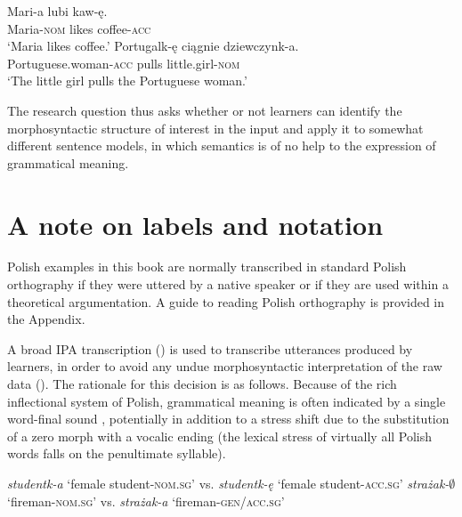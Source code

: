 \ea%
    \label{ex:01:6}
    \ea\label{ex:01:6a}
    \gll    Mari-a lubi kaw-ę.\\
            Maria-\textsc{nom}  likes  coffee-\textsc{acc}\\
    \glt    ‘Maria likes coffee.’
    \ex\label{ex:01:6b}
    \gll    Portugalk-ę ciągnie dziewczynk-a.\\
            Portuguese.woman-\textsc{acc}   pulls     little.girl-\textsc{nom}\\
    \glt    ‘The little girl pulls the Portuguese woman.’
    \z
\z

The research question thus asks whether or not learners can identify the morphosyntactic structure of interest in the input and apply it to somewhat different sentence models, in which semantics is of no help to the expression of grammatical meaning.

\section{A note on labels and notation}\label{sec:01:5}

Polish examples in this book are normally transcribed in standard Polish orthography if they were uttered by a native speaker or if they are used within a theoretical argumentation. A guide to reading Polish orthography is provided in the Appendix. 

A broad IPA transcription (\citealt{LandauEtAl1999, Jassem2003}) is used to transcribe utterances produced by learners, in order to avoid any undue morphosyntactic interpretation of the raw data (\citealt{Saturno2015La}). The rationale for this decision is as follows. Because of the rich inflectional system of Polish, grammatical meaning is often indicated by a single word-final sound , potentially in addition to a stress shift  due to the substitution of a zero morph with a vocalic ending (the lexical stress of virtually all Polish words falls on the penultimate syllable).

\ea%
    \label{ex:01:7}
    \ea\label{ex:01:7a}
    \textit{studentk-a} ‘female student-\textsc{nom.sg’} vs. \textit{studentk-ę} ‘female student-\textsc{acc.sg’}
    \ex\label{ex:01:7b}
    \textit{strażak-${\emptyset}$} ‘fireman-\textsc{nom.sg’} vs. \textit{strażak-a} ‘fireman-\textsc{gen/acc.sg’}
    \z
\z

